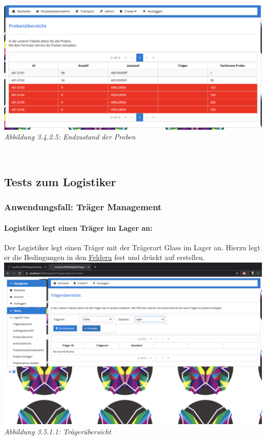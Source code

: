 \documentclass[enabledeprecatedfontcommands,fontsize=12pt,paper=a4,twoside]{scrartcl}
\begin{document}
\hypertarget{sc3.4.2.5}{
\includegraphics[width=1\textwidth]{Screenshots/3425.png}
\textit{Abbildung 3.4.2.5: Endzustand der Proben}
} \\


\subsection{Tests zum Logistiker}

\subsubsection{Anwendungsfall: Träger Management}

\paragraph{Logistiker legt einen Träger im Lager an:}

Der Logistiker legt einen Träger mit der Trägerart Glass im Lager an. Hierzu legt er die Bedingungen in den \hyperlink{sc3.5.1.1}{Feldern} fest und drückt auf erstellen. \\

\hypertarget{sc3.5.1.1}{
\includegraphics[width=1\textwidth]{Screenshots/3511.png}
\textit{Abbildung 3.5.1.1: Trägerübersicht}
} \\
\end{document}
